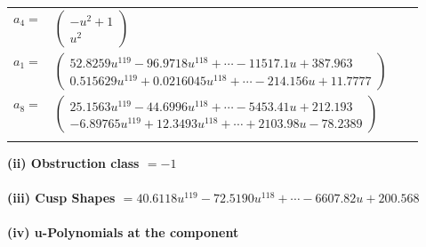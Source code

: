 \documentclass[1p]{elsarticle_modified}
\theoremstyle{definition}
\begin{document}
\begin{tabular}{m{7pt} m{180pt} m{7pt} m{180pt} }
\flushright $a_{4}=$&$\begin{pmatrix}- u^2+1\\u^2\end{pmatrix}$ \\
\flushright $a_{1}=$&$\begin{pmatrix}52.8259 u^{119}-96.9718 u^{118}+\cdots-11517.1 u+387.963\\0.515629 u^{119}+0.0216045 u^{118}+\cdots-214.156 u+11.7777\end{pmatrix}$ \\
\flushright $a_{8}=$&$\begin{pmatrix}25.1563 u^{119}-44.6996 u^{118}+\cdots-5453.41 u+212.193\\-6.89765 u^{119}+12.3493 u^{118}+\cdots+2103.98 u-78.2389\end{pmatrix}$\\&\end{tabular}
\flushleft \textbf{(ii) Obstruction class $= -1$}\\~\\
\flushleft \textbf{(iii) Cusp Shapes $= 40.6118 u^{119}-72.5190 u^{118}+\cdots-6607.82 u+200.568$}\\~\\
\newpage\renewcommand{\arraystretch}{1}
\flushleft \textbf{(iv) u-Polynomials at the component}\newline \\
\end{document}
